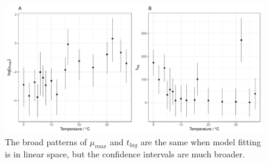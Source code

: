 \documentclass[11pt, a4paper]{article}
\begin{document}
                                        \begin{figure}[H]
        \includegraphics[width=\linewidth]{../results/tlags_linear.pdf}
        \centering
        \caption{The broad patterns of $\mu_{max}$ and $t_{lag}$ are the same when model fitting is in linear space, but the confidence intervals are much broader.}
        \label{sup:params_linear}
        \end{figure} 
        
        
    
    
        
\end{document}
